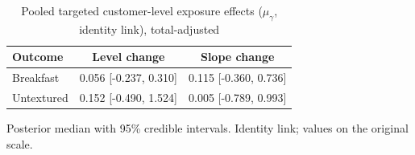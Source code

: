 \begin{table}[H]
\centering
\caption{Pooled targeted customer-level exposure effects ($\mu_\gamma$, identity link), total-adjusted}
\label{tab:a6_mu_gamma_adj}
\begin{tabular}{lcc}
\toprule
Outcome & Level change & Slope change \\
\midrule
Breakfast & 0.056 [-0.237, 0.310] & 0.115 [-0.360, 0.736] \\
Untextured & 0.152 [-0.490, 1.524] & 0.005 [-0.789, 0.993] \\
\bottomrule
\end{tabular}
\par\smallskip\footnotesize Posterior median with 95\% credible intervals. Identity link; values on the original scale.
\end{table}

